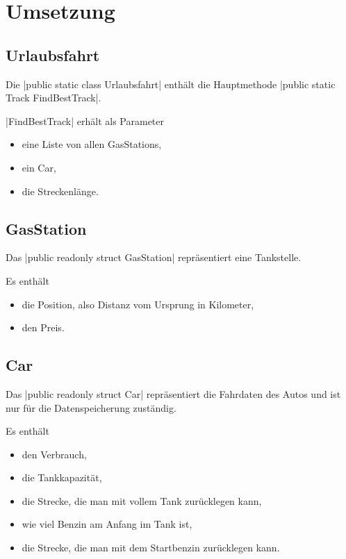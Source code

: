 \documentclass[a4paper,10pt,ngerman]{scrartcl}
\begin{document}
\section{Umsetzung}

\subsection{Urlaubsfahrt}
    Die |public static class Urlaubsfahrt| enthält die Hauptmethode |public static Track FindBestTrack|.
    
    |FindBestTrack| erhält als Parameter
        \begin{itemize}
        \item eine Liste von allen GasStations,
        \item ein Car,
        \item die Streckenlänge.
    \end{itemize}
   
\subsection{GasStation}
    Das |public readonly struct GasStation| repräsentiert eine Tankstelle.

    Es enthält
    \begin{itemize}
    	\item die Position, also Distanz vom Ursprung in Kilometer,
    	\item den Preis.
    \end{itemize}
    
\subsection{Car}
    Das |public readonly struct Car| repräsentiert die Fahrdaten des Autos und ist nur für die Datenspeicherung zuständig.

    Es enthält
    \begin{itemize}
        \item den Verbrauch,
        \item die Tankkapazität,
        \item die Strecke, die man mit vollem Tank zurücklegen kann,
        \item wie viel Benzin am Anfang im Tank ist,
        \item die Strecke, die man mit dem Startbenzin zurücklegen kann.
    \end{itemize}
    
\end{document}
